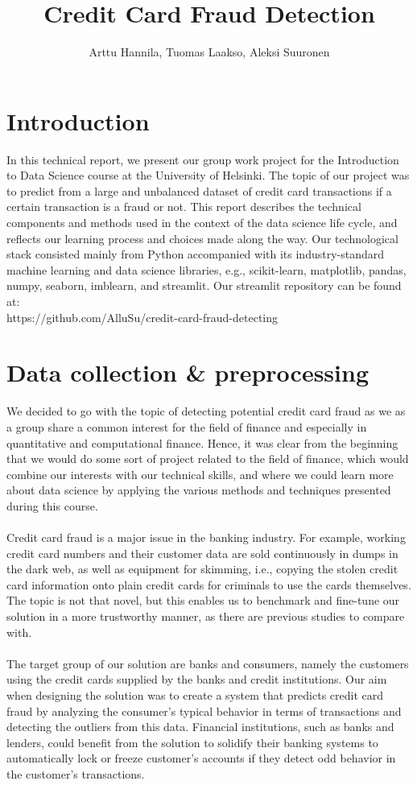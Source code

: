 \documentclass{article}
\title{Credit Card Fraud Detection}
\author{Arttu Hannila, Tuomas Laakso, Aleksi Suuronen}
\begin{document}
\maketitle

\section{Introduction}

In this technical report, we present our group work project for the Introduction to Data Science course at the University of Helsinki. The topic of our project was to predict from a large and unbalanced dataset of credit card transactions if a certain transaction is a fraud or not. This report describes the technical components and methods used in the context of the data science life cycle, and reflects our learning process and choices made along the way. Our technological stack consisted mainly from Python accompanied with its industry-standard machine learning and data science libraries, e.g., scikit-learn, matplotlib, pandas, numpy, seaborn, imblearn, and streamlit. Our streamlit repository can be found at:\\
https://github.com/AlluSu/credit-card-fraud-detecting

\section{Data collection \& preprocessing}

We decided to go with the topic of detecting potential credit card fraud as we as a group share a common interest for the field of finance and especially in quantitative and computational finance. Hence, it was clear from the beginning that we would do some sort of project related to the field of finance, which would combine our interests with our technical skills, and where we could learn more about data science by applying the various methods and techniques presented during this course.\\
\\
Credit card fraud is a major issue in the banking industry. For example, working credit card numbers and their customer data are sold continuously in dumps in the dark web, as well as equipment for skimming, i.e., copying the stolen credit card information onto plain credit cards for criminals to use the cards themselves. The topic is not that novel, but this enables us to benchmark and fine-tune our solution in a more trustworthy manner, as there are previous studies to compare with.\\
\\
The target group of our solution are banks and consumers, namely the customers using the credit cards supplied by the banks and credit institutions. Our aim when designing the solution was to create a system that predicts credit card fraud by analyzing the consumer's typical behavior in terms of transactions and detecting the outliers from this data. Financial institutions, such as banks and lenders, could benefit from the solution to solidify their banking systems to automatically lock or freeze customer's accounts if they detect odd behavior in the customer's transactions.
\end{document}
